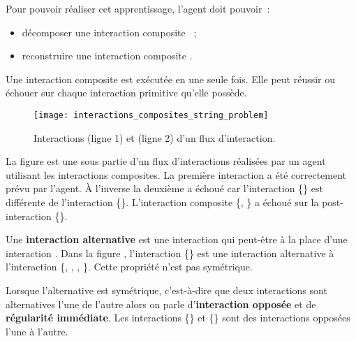 \documentclass{llncs}
\begin{document}
Pour pouvoir réaliser cet apprentissage, l'agent doit pouvoir~:
\begin{itemize}
	\item décomposer une interaction composite \intend~;
	\item reconstruire une interaction composite \enact.
\end{itemize}

Une interaction composite est exécutée en une seule fois. Elle peut réussir ou échouer sur chaque interaction primitive qu'elle possède.


\begin{figure}
	\centering
	\texttt{[image: interactions\_composites\_string\_problem]}
	\caption{Interactions \intended (ligne 1) et \enacted (ligne 2) d'un flux d'interaction.}
	\label{fig:interactions_composites_string_problem}
\end{figure}
La figure  est une sous partie d'un flux d'interactions réalisées par un agent utilisant les interactions composites.
La première interaction a été correctement prévu par l'agent. À l'inverse la deuxième a échoué car l'interaction \intended \{\carreBleu\} est différente de l'interaction \enacted \{\carreBlanc\}. L'interaction composite \intended \{\triangleBlanc, \carreBleu\} a échoué sur la post-interaction \{\carreBlanc\}. 

Une \textbf{interaction alternative} est une interaction qui peut-être \enact à la place d'une interaction \intended. Dans la figure , l'interaction \{\carreBlanc\} est une interaction alternative à l'interaction \{\carreBleu, \rondBlanc, \carreBlanc, \triangleBlanc\}. Cette propriété n'est pas symétrique.

Lorsque l'alternative est symétrique, c'est-à-dire que deux interactions sont alternatives l'une de l'autre alors on parle d'\textbf{interaction opposée} et de \textbf{régularité immédiate}. Les interactions \{\carreBlanc\} et \{\carreBleu\} sont des interactions opposées l'une à l'autre.
\end{document}
